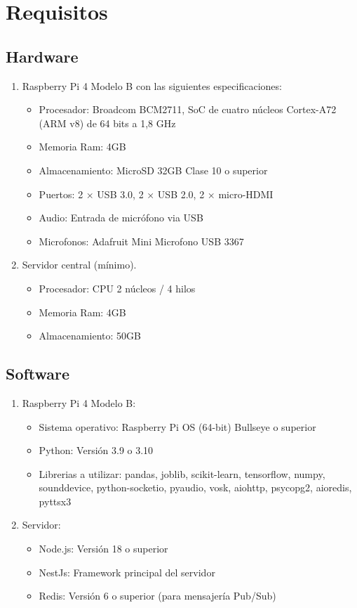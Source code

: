 \section*{Requisitos}

\subsection*{Hardware}

\begin{enumerate}
  \item Raspberry Pi 4 Modelo B con las siguientes especificaciones:
        \begin{itemize}
          \item Procesador: Broadcom BCM2711, SoC de cuatro núcleos Cortex-A72 (ARM v8) de 64 bits a 1,8 GHz
          \item Memoria Ram: 4GB
          \item Almacenamiento: MicroSD 32GB Clase 10 o superior
          \item Puertos: 2 × USB 3.0, 2 × USB 2.0, 2 × micro-HDMI
          \item Audio: Entrada de micrófono via USB
          \item Microfonos: Adafruit Mini Microfono USB 3367
        \end{itemize}
  \item Servidor central (mínimo).
        \begin{itemize}
          \item Procesador: CPU 2 núcleos / 4 hilos
          \item Memoria Ram: 4GB
          \item Almacenamiento: 50GB
        \end{itemize}
\end{enumerate}

\subsection*{Software}

\begin{enumerate}
  \item Raspberry Pi 4 Modelo B:
        \begin{itemize}
          \item Sistema operativo: Raspberry Pi OS (64-bit) Bullseye o superior
          \item Python: Versión 3.9 o 3.10
          \item Librerias a utilizar: pandas, joblib, scikit-learn, tensorflow, numpy, sounddevice, python-socketio, pyaudio, vosk, aiohttp, psycopg2, aioredis, pyttsx3
        \end{itemize}
  \item Servidor:
        \begin{itemize}
          \item Node.js: Versión 18 o superior
          \item NestJs: Framework principal del servidor
          \item Redis: Versión 6 o superior (para mensajería Pub/Sub)
        \end{itemize}
\end{enumerate}

